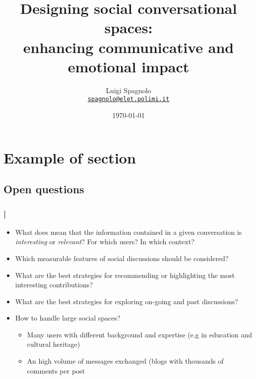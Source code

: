\documentclass[professionalfont]{beamer}
\title[Social conversational spaces]%
{\textbf{Designing social conversational spaces}:\\enhancing communicative and emotional impact}
\author[L. Spagnolo]{Luigi Spagnolo\\
{\small \href{mailto:spagnolo@elet.polimi.it}{\nolinkurl{spagnolo@elet.polimi.it}}}}
\date{\today}
\institute[POLIMI]{\textbf{Politecnico di Milano}\\Department of Electronics and Information}
\newcommand{\titlesub}{\frametitle{\textbf{\insertsectionhead}\;|\; \insertsubsectionhead}}
\begin{document}
\begin{frame}
\titlepage
\end{frame}


\section{Example of section}
\subsection{Open questions}
\begin{frame}
\titlesub
\begin{itemize}
\item What does mean that the information contained in a given conversation is \emph{interesting} or \emph{relevant}? For which users?  In which context?
\item Which measurable features of social discussions should be considered? 
\item What are the best strategies for recommending or highlighting the most interesting contributions?
\item What are the best strategies for exploring on-going and past discussions?
\item How to handle large social spaces?
\begin{itemize} 
\item Many users with different background and expertise (e.g in education and cultural heritage)
\item An high volume of messages exchanged (blogs with thousands of comments per post
\end{itemize} 
\end{itemize} 
\end{frame}
\end{document}
